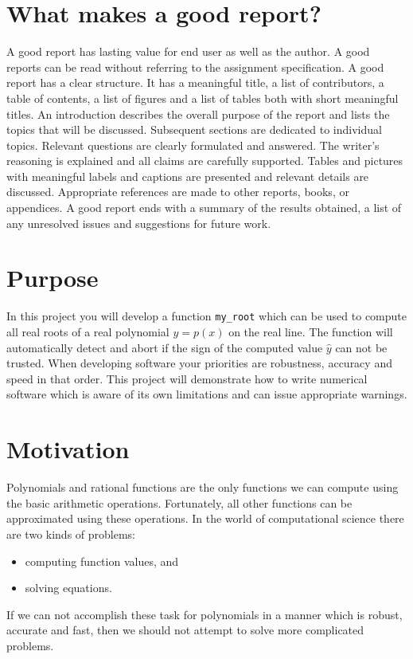 \documentclass[a4paper,12pt]{article}
\newcounter{problem}
\begin{document}
\newpage



\maketitle

\tableofcontents
\listoffigures

\section{What makes a good report?}

A good report has lasting value for end user as well as the author. A good reports can be read without referring to the assignment specification. A good report has a clear structure. It has a meaningful title, a list of contributors, a table of contents, a list of figures and a list of tables both with short meaningful titles. An introduction describes the overall purpose of the report and lists the topics that will be discussed. Subsequent sections are dedicated to individual topics. Relevant questions are clearly formulated and answered. The writer's reasoning is explained and all claims are carefully supported. Tables and pictures with meaningful labels and captions are presented and relevant details are discussed. Appropriate references are made to other reports, books, or appendices. A good report ends with a summary of the results obtained, a list of any unresolved issues and suggestions for future work.

\section{Purpose} In this project you will develop a function {\tt my\_root} which can be used to compute all real roots of a real polynomial $y = p(x)$ on the real line.
The function will automatically detect and abort if the sign of the computed value $\hat{y}$ can not be trusted. When developing software your priorities are robustness, accuracy and speed in that order. This project will demonstrate how to write numerical software which is aware of its own limitations and can issue appropriate warnings.

\section{Motivation}

Polynomials and rational functions are the only functions we can compute using the basic arithmetic operations. Fortunately, all other functions can be approximated using these operations. In the world of computational science there are two kinds of problems:
\begin{itemize}
\item computing function values, and
\item solving equations.
\end{itemize}
If we can not accomplish these task for polynomials in a manner which is robust, accurate and fast, then we should not attempt to solve more complicated problems.
\end{document}
